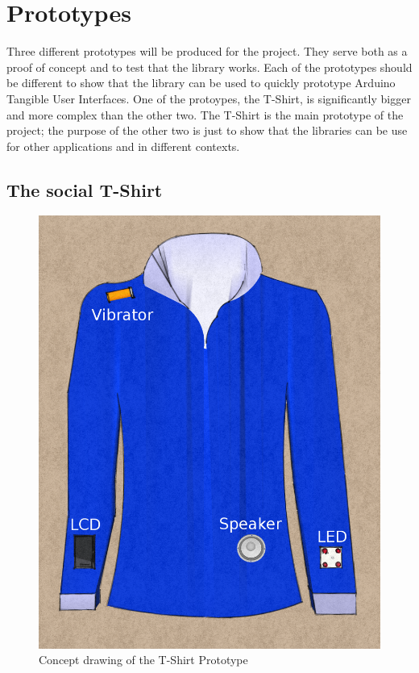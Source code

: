 \section{Prototypes}
\label{sec:prototypes}
Three different prototypes will be produced for the project. They serve both as a proof of concept and
to test that the library works. Each of the prototypes should be different to show that the library can be
used to quickly prototype Arduino Tangible User Interfaces. One of the protoypes, the T-Shirt, is significantly
bigger and more complex than the other two. The T-Shirt is the main prototype of the project; the purpose of the other two
is just to show that the libraries can be use for other applications and in different contexts.

\subsection{The social T-Shirt}
	
\begin{figure}
	\begin{center}
	\includegraphics[scale=0.2]{img/design-tshirtproto}
	\end{center}
	\caption{Concept drawing of the T-Shirt Prototype}
	\label{fig:design-TShirt}
\end{figure}
	
